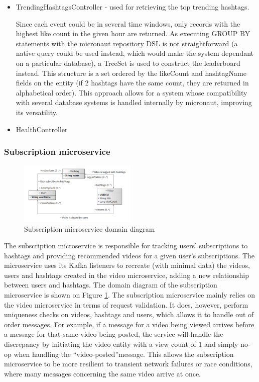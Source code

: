 \documentclass[parskip=full]{article}
\begin{document}
    \begin{itemize}
        \item TrendingHashtagsController - used for retrieving the top trending hashtags.

        Since each event could be in several time windows, only records with the highest like count in the given hour are returned.
        As executing GROUP BY statements with the micronaut repository DSL is not straightforward (a native query could be used instead, which would make the system dependant on a particular database), a TreeSet \cite{treeSet} is used to construct the leaderboard instead.
        This structure is a set ordered by the likeCount and hashtagName fields on the entity (if 2 hashtags have the same count, they are returned in alphabetical order).
        This approach allows for a system whose compatibility with several database systems is handled internally by micronaut, improving its versatility.
        \item HealthController
    \end{itemize}
    \pagebreak
    \subsubsection{Subscription microservice}
    \begin{figure}
        \includegraphics[width=0.5\textwidth]{sm-domain-diagram}
        \caption{Subscription microservice domain diagram}
        \label{fig:smDomain}
        \vspace{-1em}
    \end{figure}
    The subscription microservice is responsible for tracking users' subscriptions to hashtags and providing recommended videos for a given user's subscriptions.
    The microservice uses its Kafka listeners to recreate (with minimal data) the videos, users and hashtags created in the video
    microservice, adding a new relationship between users and hashtags.
    The domain diagram of the subscription microservice is shown on Figure \ref{fig:smDomain}.
    The subscription microservice mainly relies on the video microservice in terms of request validation.
    It does, however, perform uniqueness checks on videos, hashtags and users, which allows it to handle out of order messages.
    For example, if a message for a video being viewed arrives before a message for that same video being posted, the service will handle the discrepancy by initiating the video entity with a view count of 1 and simply no-op when handling the ``video-posted''message.
    This allows the subscription microservice to be more resilient to transient network failures or race conditions, where many messages concerning the same video arrive at once.
\end{document}
